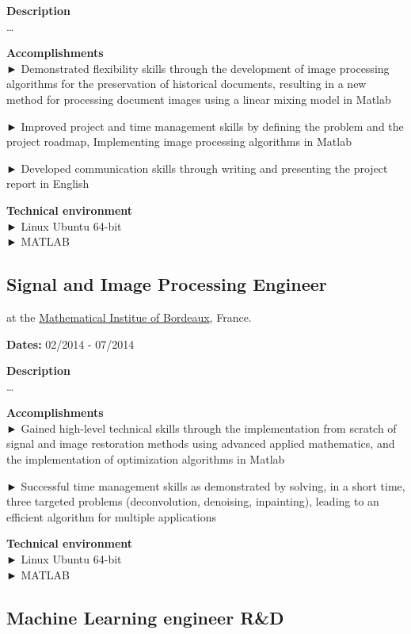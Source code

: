 \documentclass[
]{article}
\begin{document}
\textbf{Description}\\
\ldots{}

\textbf{Accomplishments}\\
► Demonstrated flexibility skills through the development of image
processing algorithms for the preservation of historical documents,
resulting in a new method for processing document images using a linear
mixing model in Matlab

► Improved project and time management skills by defining the problem
and the project roadmap, Implementing image processing algorithms in
Matlab

► Developed communication skills through writing and presenting the
project report in English

\textbf{Technical environment}\\
► Linux Ubuntu 64-bit\\
► MATLAB

\hypertarget{signal-and-image-processing-engineer}{%
\subsection{Signal and Image Processing
Engineer}\label{signal-and-image-processing-engineer}}

at the \href{https://www.math.u-bordeaux.fr/imb/spip.php}{Mathematical
Institue of Bordeaux}, France.

\textbf{Dates:} 02/2014 - 07/2014

\textbf{Description}\\
\ldots{}

\textbf{Accomplishments}\\
► Gained high-level technical skills through the implementation from
scratch of signal and image restoration methods using advanced applied
mathematics, and the implementation of optimization algorithms in Matlab

► Successful time management skills as demonstrated by solving, in a
short time, three targeted problems (deconvolution, denoising,
inpainting), leading to an efficient algorithm for multiple applications

\textbf{Technical environment}\\
► Linux Ubuntu 64-bit\\
► MATLAB

\hypertarget{machine-learning-engineer-rd}{%
\subsection{Machine Learning engineer \textbar{}
R\&D}\label{machine-learning-engineer-rd}}
\end{document}
